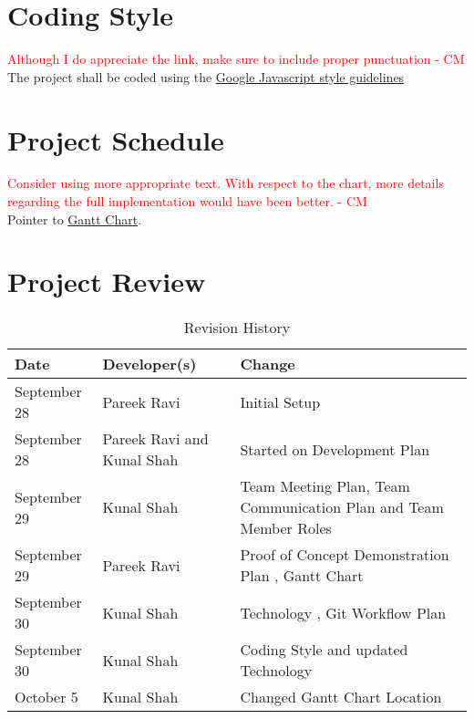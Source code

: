 \documentclass{article}
\begin{document}
\section{Coding Style}
\textcolor{red}{Although I do appreciate the link, make sure to include proper punctuation - CM} \\
The project shall be coded using the \href{https://google.github.io/styleguide/javascriptguide.xml}
{Google Javascript style guidelines}

\section{Project Schedule}

\textcolor{red}{Consider using more appropriate text. With respect to the chart, more details regarding the full implementation would have been better. - CM} \\
Pointer to \href{run:../../ProjectSchedule/Gantt Chart.gan}{Gantt Chart}.

\section{Project Review}

\newpage

\begin{table}[hp]
\caption{Revision History} \label{TblRevisionHistory}
\begin{tabularx}{\textwidth}{llX}
\toprule
\textbf{Date} & \textbf{Developer(s)} & \textbf{Change}\\
\midrule
September 28 & Pareek Ravi & Initial Setup\\
September 28 & Pareek Ravi and Kunal Shah & Started on Development Plan\\
September 29 & Kunal Shah & Team Meeting Plan, Team Communication Plan and Team Member Roles\\
September 29 & Pareek Ravi & Proof of Concept Demonstration Plan , Gantt Chart\\
September 30 & Kunal Shah & Technology , Git Workflow Plan \\
September 30 & Kunal Shah & Coding Style and updated Technology\\
October 5 & Kunal Shah & Changed Gantt Chart Location\\

\bottomrule
\end{tabularx}
\end{table}
\end{document}
